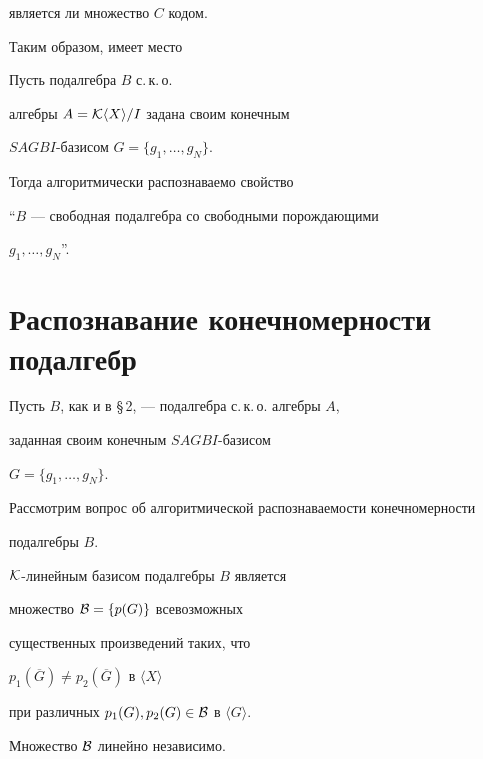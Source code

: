 является ли множество $C$ кодом.





Таким образом, имеет место





\begin{thm}


Пусть подалгебра $B$ с.\,к.\,о.


алгебры $A={\cal K}\langle X\rangle /I$ задана своим конечным


$SAGBI$-базисом $G=\lbrace g_{1},\dotsc,g_{N}\rbrace$.


Тогда алгоритмически распознаваемо свойство


``$B$ --- свободная подалгебра со свободными порождающими


$g_{1},\dotsc,g_{N}$''.


\end{thm}








\section{Распознавание конечномерности подалгебр}








Пусть $B$, как и в \S\,2, --- подалгебра с.\,к.\,о. алгебры $A$,


заданная своим конечным $SAGBI$-базисом 


$G=\lbrace g_{1},\dotsc,g_{N}\rbrace$.


Рассмотрим вопрос об алгоритмической распознаваемости конечномерности


подалгебры $B$.








${\cal K}$-линейным базисом подалгебры $B$ является


множество ${\cal B}=\lbrace p(G)\rbrace$ всевозможных


существенных произведений таких, что


$p_{1}(\overline{G})\ne p_{2}(\overline{G})$ в $\langle X\rangle$


при различных  $p_{1}(G),p_{2}(G)\in\cal B$ в $\langle G\rangle$.


Множество ${\cal B}$ линейно независимо.


